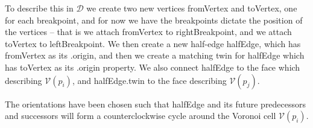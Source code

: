 To describe this in $\mathcal{D}$ we create two new vertices \textsf{fromVertex} and \textsf{toVertex}, one for each breakpoint, and for now we have the breakpoints dictate the position of the vertices -- that is we attach \textsf{fromVertex} to \textsf{rightBreakpoint}, and we attach \textsf{toVertex} to \textsf{leftBreakpoint}. We then create a new half-edge \textsf{halfEdge}, which has \textsf{fromVertex} as its \textsf{.origin}, and then we create a matching twin for \textsf{halfEdge} which has \textsf{toVertex} as its \textsf{.origin} property. We also connect \textsf{halfEdge} to the face which describing $\mathcal{V}(p_i)$, and \textsf{halfEdge.twin} to the face describing $\mathcal{V}(p_j)$.

The orientations have been chosen such that \textsf{halfEdge} and its future predecessors and successors will form a counterclockwise cycle around the Voronoi cell $\mathcal{V}(p_i)$.

\newpage

